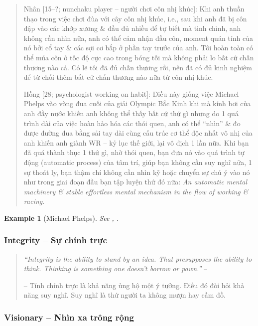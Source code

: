 \documentclass[12pt]{article}
\newtheorem{example}{Example}
\begin{document}
\begin{quote}
	{\sf Nhân [15--?; nunchaku player -- người chơi côn nhị khúc]}: Khi anh thuần thạo trong việc chơi đùa với cây côn nhị khúc, i.e., sau khi anh đã bị côn đập vào các khớp xương \& đầu đủ nhiều để tự biết mà tinh chỉnh, anh không cần nhìn nữa, anh có thể cảm nhận đầu côn, moment quán tính của nó bởi cổ tay \& các sợi cơ bắp ở phần tay trước của anh. Tôi hoàn toàn có thể múa côn ở tốc độ cực cao trong bóng tối mà không phải lo bất cứ chấn thương nào cả. Có lẽ tôi đã đủ chấn thương rồi, nên đã có đủ kinh nghiệm để từ chối thêm bất cứ chấn thương nào nữa từ côn nhị khúc.
	
	{\sf Hồng [28; psychologist working on habit]}: Điều này giống việc {\sc Michael Phelps} vào vòng đua cuối của giải Olympic Bắc Kinh khi mà kính bơi của anh đầy nước khiến anh không thể thấy bất cứ thứ gì nhưng do 1 quá trình dài của việc hoàn hảo hóa các thói quen, anh có thể ``nhìn'' \& đo được đường đua bằng sải tay dài cùng cấu trúc cơ thể độc nhất vô nhị của anh khiến anh giành WR -- kỷ lục thế giới, lại vô địch 1 lần nữa. Khi bạn đã quá thành thục 1 thứ gì, nhờ thói quen, bạn đưa nó vào quá trình tự động (automatic process) của tâm trí, giúp bạn không cần suy nghĩ nữa, 1 sự thoát ly, bạn thậm chí không cần nhìn kỹ hoặc chuyển sự chú ý vào nó như trong giai đoạn đầu bạn tập luyện thứ đó nữa: {\it An automatic mental machinery \& stable effortless mental mechanism in the flow of working \& racing}.
\end{quote}

\begin{example}[{\sc Michael Phelps}]
	See {\rm\cite{Duhigg_habit}, \cite[pp. 176--184]{Duhigg_habit_VN}}.
\end{example}

\subsubsection{Integrity -- Sự chính trực}

\begin{quotation}
	{\it``Integrity is the ability to stand by an idea. That presupposes the ability to think. Thinking is something one doesn't borrow or pawn.''} -- \cite{Rand_fountainhead}
	
	-- Tính chính trực là khả năng ủng hộ một ý tưởng. Điều đó đòi hỏi khả năng suy nghĩ. Suy nghĩ là thứ người ta không mượn hay cầm đồ.
\end{quotation}

\subsubsection{Visionary -- Nhìn xa trông rộng}
\end{document}
